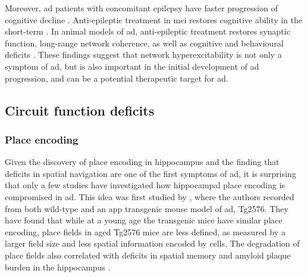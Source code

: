 Moreover, \gls{ad} patients with concomitant epilepsy have faster progression of cognitive decline \citep{vossel13, bakker15}. Anti-epileptic treatment in \gls{mci} restores cognitive ability in the short-term \citep{bakker15}. In animal models of \gls{ad}, anti-epileptic treatment restores synaptic function, long-range network coherence, as well as cognitive and behavioural deficits \citep{sanchez12, busche15}. These findings suggest that network hyperexcitability is not only a symptom of \gls{ad}, but is also important in the initial development of \gls{ad} progression, and can be a potential therapeutic target for \gls{ad}.

\subsection{Circuit function deficits}
\begin{comment}
\subsubsection{synchrony}
\citep{goutagny13}
\end{comment}
\subsubsection{Place encoding}
Given the discovery of place encoding in hippocampus and the finding that deficits in spatial navigation are one of the first symptoms of \gls{ad}, it is surprising that only a few studies have investigated how hippocampal place encoding is compromised in \gls{ad}. This idea was first studied by \citet{cacucci08}, where the authors recorded from both wild-type and an \gls{app} transgenic mouse model of \gls{ad}, Tg2576. They have found that while at a young age the transgenic mice have similar place encoding, place fields in aged Tg2576 mice are less defined, as measured by a larger field size and less spatial information encoded by cells. The degradation of place fields also correlated with deficits in spatial memory and amyloid plaque burden in the hippocampus \citep{cacucci08}.

